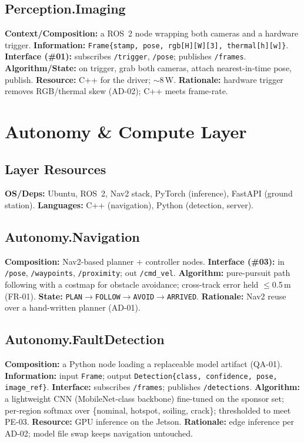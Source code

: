 \documentclass[11pt,letterpaper]{article}
\begin{document}
\subsection{Perception.Imaging}
\textbf{Context/Composition:} a ROS~2 node wrapping both cameras and a hardware
trigger. \textbf{Information:} \texttt{Frame\{stamp, pose, rgb[H][W][3],
thermal[h][w]\}}. \textbf{Interface (\#01):} subscribes \texttt{/trigger},
\texttt{/pose}; publishes \texttt{/frames}. \textbf{Algorithm/State:} on trigger,
grab both cameras, attach nearest-in-time pose, publish. \textbf{Resource:} C++ for
the driver; $\sim$8\,W. \textbf{Rationale:} hardware trigger removes RGB/thermal
skew (AD-02); C++ meets frame-rate.

\section{Autonomy \& Compute Layer}
\subsection{Layer Resources}
\textbf{OS/Deps:} Ubuntu, ROS~2, Nav2 stack, PyTorch (inference), FastAPI (ground
station). \textbf{Languages:} C++ (navigation), Python (detection, server).
\subsection{Autonomy.Navigation}
\textbf{Composition:} Nav2-based planner + controller nodes.
\textbf{Interface (\#03):} in \texttt{/pose}, \texttt{/waypoints},
\texttt{/proximity}; out \texttt{/cmd\_vel}. \textbf{Algorithm:} pure-pursuit path
following with a costmap for obstacle avoidance; cross-track error held $\leq$0.5\,m
(FR-01). \textbf{State:} \texttt{PLAN$\rightarrow$FOLLOW$\rightarrow$AVOID$\rightarrow$ARRIVED}.
\textbf{Rationale:} Nav2 reuse over a hand-written planner (AD-01).
\subsection{Autonomy.FaultDetection}
\textbf{Composition:} a Python node loading a replaceable model artifact
(QA-01). \textbf{Information:} input \texttt{Frame}; output
\texttt{Detection\{class, confidence, pose, image\_ref\}}. \textbf{Interface:}
subscribes \texttt{/frames}; publishes \texttt{/detections}. \textbf{Algorithm:} a
lightweight CNN (MobileNet-class backbone) fine-tuned on the sponsor set; per-region
softmax over \{nominal, hotspot, soiling, crack\}; thresholded to meet PE-03.
\textbf{Resource:} GPU inference on the Jetson. \textbf{Rationale:} edge inference
per AD-02; model file swap keeps navigation untouched.
\end{document}
